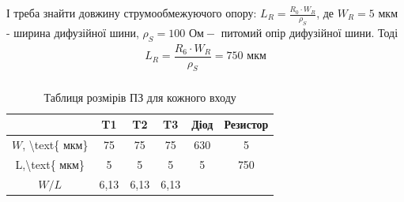 \documentclass[a4paper,14pt]{extreport}
\begin{document}
	І треба знайти довжину струмообмежуючого опору: $L_{R}=\frac{R_{0} \cdot W_{R}}{\rho_{S}}$, де $W_{R}=5 \text{ мкм}$
	- ширина дифузійної шини, $\rho_{S}=100 \text{ Ом}-$ питомий опір дифузійної шини.
	Тоді
	$$
	\begin{array}{c}
	L_{R}=\dfrac{R_{6} \cdot W_{R}}{\rho_{S}}=750 \text{ мкм} \\

	\end{array}
	$$


	\begin{table}[h]
	\begin{center}

	\caption{ Таблиця розмірів ПЗ для кожного входу}
	\begin{tabular}{|c|c|c|c|c|c|}
	\hline
	& T1   & T2   & T3   & Діод & Резистор \\ \hline
	$W$, \textbackslash{}text\{ мкм\} & 75   & 75   & 75   & 630  & 5        \\ \hline
	L,\textbackslash{}text\{ мкм\}    & 5    & 5    & 5    & 5    & 750      \\ \hline
	$W / L$                           & 6,13 & 6,13 & 6,13 &      &          \\ \hline
	\end{tabular}

	\end{center}
	\end{table}

\newpage
\end{document}
